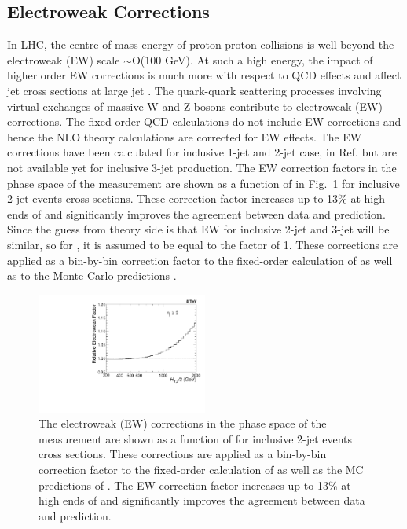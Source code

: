 \subsection{Electroweak Corrections}
\label{sec:EW}
In LHC, the centre-of-mass energy of proton-proton collisions is well beyond the electroweak (EW) scale $\sim$O(100 GeV). At such a high energy, the impact of higher order EW corrections is much more with respect to QCD effects \cite{Hollik:2004dz} and affect jet cross sections at large jet \pt. The quark-quark scattering processes involving virtual exchanges of massive W and Z bosons contribute to electroweak (EW) corrections. The fixed-order QCD calculations do not include EW corrections and hence the NLO theory calculations are corrected for EW effects. The EW corrections have been calculated for inclusive 1-jet and 2-jet case, in Ref. \cite{Dittmaier:2012kx} but are not available yet for inclusive 3-jet production. The EW correction factors in the phase space of the measurement are shown as a function of \httwo in Fig.~\ref{fig:EW} for inclusive 2-jet events cross sections. These correction factor increases up to 13\% at high ends of \httwo and significantly improves the agreement between data and prediction. Since the guess from theory side is that EW for inclusive 2-jet and 3-jet will be similar, so for \ratio, it is assumed to be equal to the factor of 1. These corrections are applied as a bin-by-bin correction factor to the fixed-order calculation of \NLOJETPP as well as to the Monte Carlo predictions . 

\begin{figure}[!htbp]
 \begin{center}
 \includegraphics[width=0.5\textwidth]{Plots_HT_2_150/EW_2.pdf}
 \caption{The electroweak (EW) corrections \cite{Dittmaier:2012kx} in the phase space of the measurement are shown as a function of \httwo for inclusive 2-jet events cross sections. These corrections are applied as a bin-by-bin correction factor to the fixed-order calculation of \NLOJETPP as well as the MC predictions of \MadGraphFn\plusn \PYTHIAS. The EW correction factor increases up to 13\% at high ends of \httwo and significantly improves the agreement between data and prediction.}
 \label{fig:EW}
 \end{center}
\end{figure}


